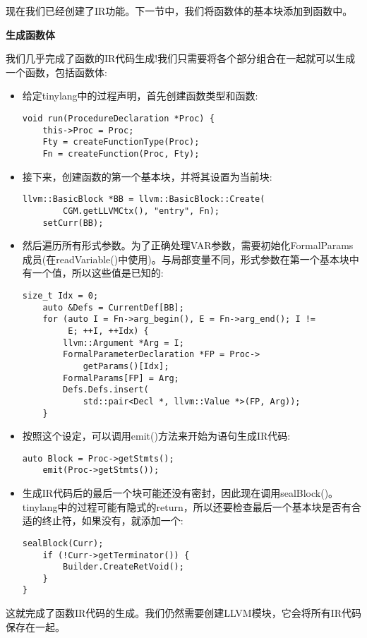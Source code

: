 现在我们已经创建了IR功能。下一节中，我们将函数体的基本块添加到函数中。\par

\hspace*{\fill} \par %
\textbf{生成函数体}

我们几乎完成了函数的IR代码生成!我们只需要将各个部分组合在一起就可以生成一个函数，包括函数体:\par

\begin{itemize}
\item 给定tinylang中的过程声明，首先创建函数类型和函数:
\begin{lstlisting}[caption={}]
void run(ProcedureDeclaration *Proc) {
	this->Proc = Proc;
	Fty = createFunctionType(Proc);
	Fn = createFunction(Proc, Fty);
\end{lstlisting}

\item 接下来，创建函数的第一个基本块，并将其设置为当前块:
\begin{lstlisting}[caption={}]
	llvm::BasicBlock *BB = llvm::BasicBlock::Create(
		CGM.getLLVMCtx(), "entry", Fn);
	setCurr(BB);
\end{lstlisting}

\item 然后遍历所有形式参数。为了正确处理VAR参数，需要初始化FormalParams成员(在readVariable()中使用)。与局部变量不同，形式参数在第一个基本块中有一个值，所以这些值是已知的:
\begin{lstlisting}[caption={}]
	size_t Idx = 0;
	auto &Defs = CurrentDef[BB];
	for (auto I = Fn->arg_begin(), E = Fn->arg_end(); I !=
		 E; ++I, ++Idx) {
		llvm::Argument *Arg = I;
		FormalParameterDeclaration *FP = Proc->
			getParams()[Idx];
		FormalParams[FP] = Arg;
		Defs.Defs.insert(
			std::pair<Decl *, llvm::Value *>(FP, Arg));
	}
\end{lstlisting}

\item 按照这个设定，可以调用emit()方法来开始为语句生成IR代码:
\begin{lstlisting}[caption={}]
	auto Block = Proc->getStmts();
	emit(Proc->getStmts());
\end{lstlisting}

\item 生成IR代码后的最后一个块可能还没有密封，因此现在调用sealBlock()。tinylang中的过程可能有隐式的return，所以还要检查最后一个基本块是否有合适的终止符，如果没有，就添加一个:
\begin{lstlisting}[caption={}]
	sealBlock(Curr);
	if (!Curr->getTerminator()) {
		Builder.CreateRetVoid();
	}
}
\end{lstlisting}

\end{itemize}

这就完成了函数IR代码的生成。我们仍然需要创建LLVM模块，它会将所有IR代码保存在一起。\par



